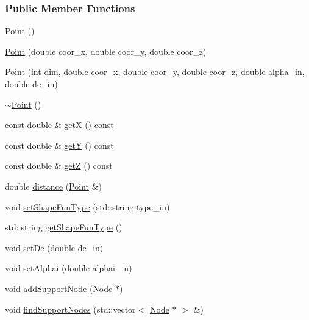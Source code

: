 \subsubsection*{Public Member Functions}
\begin{DoxyCompactItemize}
\item 
\hyperlink{classmknix_1_1_point_ade62bb71dbbd34efa4ed5090f37f2d9a}{Point} ()
\item 
\hyperlink{classmknix_1_1_point_ae9012b54d57e557b16d47e56857cd624}{Point} (double coor\-\_\-x, double coor\-\_\-y, double coor\-\_\-z)
\item 
\hyperlink{classmknix_1_1_point_ad47e79bd02cbfe8e668caf9d5b9c13f0}{Point} (int \hyperlink{classmknix_1_1_point_ab97e4bca7f299237ff3f8cc2449b1be1}{dim}, double coor\-\_\-x, double coor\-\_\-y, double coor\-\_\-z, double alpha\-\_\-in, double dc\-\_\-in)
\item 
\hyperlink{classmknix_1_1_point_ad20e0663241df1986b8250a0ab7f2358}{$\sim$\-Point} ()
\item 
const double \& \hyperlink{classmknix_1_1_point_a2942110ac86c21e11986081670bb3a82}{get\-X} () const 
\item 
const double \& \hyperlink{classmknix_1_1_point_a16955d7ef56edea059119f93905e1196}{get\-Y} () const 
\item 
const double \& \hyperlink{classmknix_1_1_point_a739698b4f6a21b40e7fc7c82af69c479}{get\-Z} () const 
\item 
double \hyperlink{classmknix_1_1_point_a93551900ae5e76ec764af9eb894cd0c0}{distance} (\hyperlink{classmknix_1_1_point}{Point} \&)
\item 
void \hyperlink{classmknix_1_1_point_ac8cc95650eac1e676c11f2874d899a7b}{set\-Shape\-Fun\-Type} (std\-::string type\-\_\-in)
\item 
std\-::string \hyperlink{classmknix_1_1_point_af432e99d48f5db21728db72ec0d49025}{get\-Shape\-Fun\-Type} ()
\item 
void \hyperlink{classmknix_1_1_point_abf06bbd55297ab42ecf0ef49a258ad09}{set\-Dc} (double dc\-\_\-in)
\item 
void \hyperlink{classmknix_1_1_point_aeed553d37db81fa6f7ea08834ec98724}{set\-Alphai} (double alphai\-\_\-in)
\item 
void \hyperlink{classmknix_1_1_point_a41f06a5ee1993d52db1c629a1ab8ae3f}{add\-Support\-Node} (\hyperlink{classmknix_1_1_node}{Node} $\ast$)
\item 
void \hyperlink{classmknix_1_1_point_a88289f6649c16591f708e2a6f5eb749e}{find\-Support\-Nodes} (std\-::vector$<$ \hyperlink{classmknix_1_1_node}{Node} $\ast$ $>$ \&)

\end{DoxyCompactItemize}
